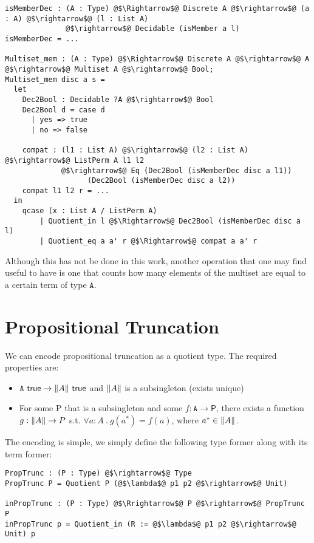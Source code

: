 \documentclass[12pt,twoside,maitrise]{dms}
\theoremstyle{definition}
\numberwithin{equation}{section}
\numberwithin{table}{chapter}
\numberwithin{figure}{chapter}
\DeclarePairedDelimiter{\norm}{\lVert}{\rVert}
\newcommand\kw[1] {\textsf{#1}}
\newcommand\id[1] {\texttt{#1}}
\newcommand\fn[1] {\texttt{#1}}
\begin{document}
\begin{verbatim}
isMemberDec : (A : Type) @$\Rightarrow$@ Discrete A @$\rightarrow$@ (a : A) @$\rightarrow$@ (l : List A)
              @$\rightarrow$@ Decidable (isMember a l)
isMemberDec = ...

Multiset_mem : (A : Type) @$\Rightarrow$@ Discrete A @$\rightarrow$@ A @$\rightarrow$@ Multiset A @$\rightarrow$@ Bool;
Multiset_mem disc a s =
  let
    Dec2Bool : Decidable ?A @$\rightarrow$@ Bool
    Dec2Bool d = case d
      | yes => true
      | no => false

    compat : (l1 : List A) @$\rightarrow$@ (l2 : List A) @$\rightarrow$@ ListPerm A l1 l2
             @$\rightarrow$@ Eq (Dec2Bool (isMemberDec disc a l1))
                   (Dec2Bool (isMemberDec disc a l2))
    compat l1 l2 r = ...
  in
    qcase (x : List A / ListPerm A)
        | Quotient_in l @$\Rightarrow$@ Dec2Bool (isMemberDec disc a l)
        | Quotient_eq a a' r @$\Rightarrow$@ compat a a' r
\end{verbatim}

Although this has not be done in this work, another operation that one may find
useful to have is one that counts how many elements of the multiset are equal to
a certain term of type $\fn{A}$.

\section{Propositional Truncation}

We can encode propositional truncation as a quotient type. The required properties are:

\begin{itemize}
	\item $\id{A} \ \kw{true} \rightarrow \norm{A} \ \kw{true}$ and $\norm{A}$
      is a subsingleton (exists unique)
	\item For some P that is a subsingleton and some $f : \id{A} \rightarrow \kw{P}$, there exists a function $g : \norm{A} \rightarrow P$ s.t. $ \forall a : A \ . \ g(a^*) = f(a)$, where $a^* \in \norm{A}$.
\end{itemize}

The encoding is simple, we simply define the following type former along with its term former:

\begin{verbatim}
PropTrunc : (P : Type) @$\rightarrow$@ Type
PropTrunc P = Quotient P (@$\lambda$@ p1 p2 @$\rightarrow$@ Unit)

inPropTrunc : (P : Type) @$\Rrightarrow$@ P @$\rightarrow$@ PropTrunc P
inPropTrunc p = Quotient_in (R := @$\lambda$@ p1 p2 @$\rightarrow$@ Unit) p
\end{verbatim}
\end{document}
